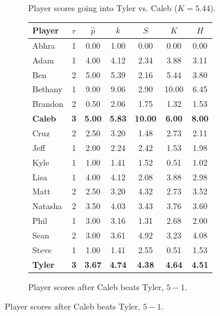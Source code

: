 \documentclass[letterpaper, 10 pt, conference]{ieeeconf}  %
\begin{document}
\begin{figure}
\begin{subfigure}[hb]{0.4\textwidth}
                \caption{Player scores going into Tyler vs. Caleb ($K=5.44$).}
        \end{subfigure}
        \begin{subfigure}[hb]{0.4\textwidth}
                \footnotesize
                \centering
                \begin{tabular}{lccc|ccc}
                        Player	&	$r$	&	$\hat{p}$	&	$k$	&	$S$	&	$K$	&	$H$	\\
                        \midrule													
                        Abhra	&	1	&	0.00	&	1.00	&	0.00	&	0.00	&	0.00	\\
                        Adam	&	1	&	4.00	&	4.12	&	2.34	&	3.88	&	3.11	\\
                        Ben	&	2	&	5.00	&	5.39	&	2.16	&	5.44	&	3.80	\\
                        Bethany	&	1	&	9.00	&	9.06	&	2.90	&	10.00	&	6.45	\\
                        Brandon	&	2	&	0.50	&	2.06	&	1.75	&	1.32	&	1.53	\\
                        \textbf{Caleb}	&	\textbf{3}	&	\textbf{5.00}	&	\textbf{5.83}	&	\textbf{10.00}	&	\textbf{6.00}	&	\textbf{8.00}	\\
                        Cruz	&	2	&	2.50	&	3.20	&	1.48	&	2.73	&	2.11	\\
                        Jeff	&	1	&	2.00	&	2.24	&	2.42	&	1.53	&	1.98	\\
                        Kyle	&	1	&	1.00	&	1.41	&	1.52	&	0.51	&	1.02	\\
                        Lisa	&	1	&	4.00	&	4.12	&	2.08	&	3.88	&	2.98	\\
                        Matt	&	2	&	2.50	&	3.20	&	4.32	&	2.73	&	3.52	\\
                        Natasha	&	2	&	3.50	&	4.03	&	3.43	&	3.76	&	3.60	\\
                        Phil	&	1	&	3.00	&	3.16	&	1.31	&	2.68	&	2.00	\\
                        Sean	&	2	&	3.00	&	3.61	&	4.92	&	3.23	&	4.08	\\
                        Steve	&	1	&	1.00	&	1.41	&	2.55	&	0.51	&	1.53	\\
                        \textbf{Tyler}	&	\textbf{3}	&	\textbf{3.67}	&	\textbf{4.74}	&	\textbf{4.38}	&	\textbf{4.64}	&	\textbf{4.51}	\\
                \end{tabular}
                \caption{Player scores after Caleb beats Tyler, $5-1$.}
        \end{subfigure}

\end{figure}
\end{document}
